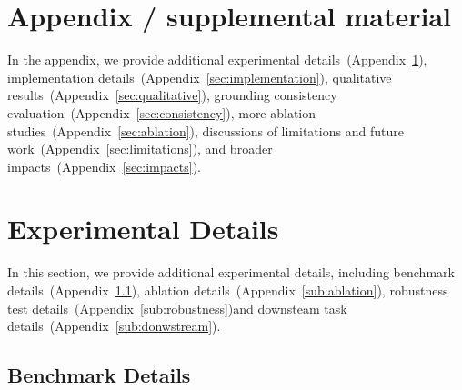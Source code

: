 \newpage
\appendix


\section*{Appendix / supplemental material}
In the appendix, we provide additional experimental details~(Appendix~\ref{sec:experimental}), implementation details~(Appendix~\ref{sec:implementation}), qualitative results~(Appendix~\ref{sec:qualitative}), grounding consistency evaluation~(Appendix~\ref{sec:consistency}), more ablation studies~(Appendix~\ref{sec:ablation}), discussions of limitations and future work~(Appendix~\ref{sec:limitations}), and broader impacts~(Appendix~\ref{sec:impacts}).

\section{Experimental Details}
\label{sec:experimental}

In this section, we provide additional experimental details, including benchmark details~(Appendix~\ref{sub:benchmarks}), ablation details~(Appendix~\ref{sub:ablation}), robustness test details~(Appendix~\ref{sub:robustness})and downsteam task details~(Appendix~\ref{sub:donwstream}).

\subsection{Benchmark Details}
\label{sub:benchmarks}

